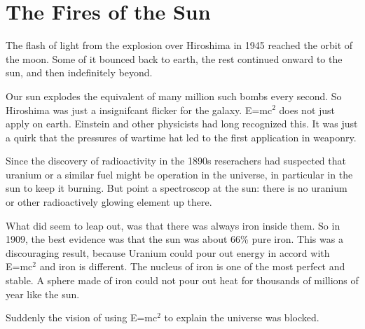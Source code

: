 %

\section{The Fires of the Sun}

The flash of light from the explosion over Hiroshima in 1945 reached the orbit of the moon. Some of it bounced back to earth, the rest continued onward to the sun, and then indefinitely beyond.

Our sun explodes the equivalent of many million such bombs every second. So Hiroshima was just a insignifcant flicker for the galaxy. E=mc$^2$ does not just apply on earth. Einstein and other physicists had long recognized this. It was just a quirk that the pressures of wartime hat led to the first application in weaponry.

Since the discovery of radioactivity in the 1890s reserachers had suspected that uranium or a similar fuel might be operation in the universe, in particular in the sun to keep it burning. But point a spectroscop at the sun: there is no uranium or other radioactively glowing element up there.

What did seem to leap out, was that there was always iron inside them. So in 1909, the best evidence was that the sun was about 66\% pure iron. This was a discouraging result, because Uranium could pour out energy in accord with E=mc$^2$ and iron is different. The nucleus of iron is one of the most perfect and stable. A sphere made of iron could not pour out heat for thousands of millions of year like the sun. 

Suddenly the vision of using E=mc$^2$ to explain the universe was blocked.

